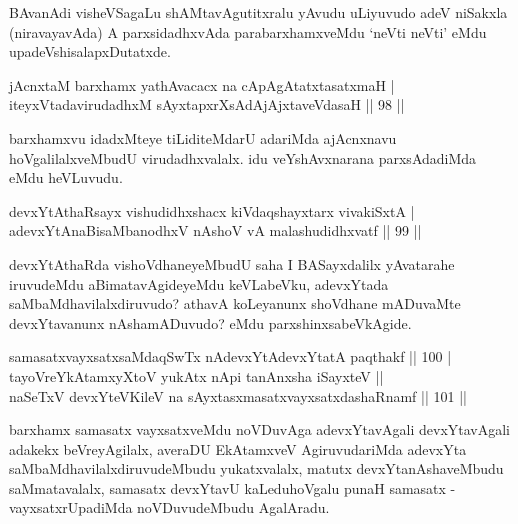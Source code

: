 \begin{artha}
BAvanAdi visheVSagaLu shAMtavAgutitxralu yAvudu uLiyuvudo adeV niSakxla (niravayavAda) A parxsidadhxvAda parabarxhamxveMdu `neVti neVti' eMdu upadeVshisalapxDutatxde.
\end{artha}

\begin{shl}
jAcnxtaM barxhamx yathAvacacx na cApAgAtatxtasatxmaH |\\
iteyxVtadavirudadhxM sAyxtapxrXsAdAjAjxtaveVdasaH \hfill || 98 ||
\end{shl}

\begin{artha}
barxhamxvu idadxMteye tiLiditeMdarU adariMda ajAcnxnavu hoVgalilalxveMbudU virudadhxvalalx. idu veYshAvxnarana parxsAdadiMda eMdu heVLuvudu.
\end{artha}


\begin{shl}
devxYtAthaRsayx vishudidhxshacx kiVdaqshayxtarx vivakiSxtA |\\
adevxYtAnaBisaMbanodhxV nAshoV vA malashudidhxvatf \hfill || 99 ||
\end{shl}

\begin{artha}
devxYtAthaRda vishoVdhaneyeMbudU saha I BASayxdalilx yAvatarahe iruvudeMdu aBimatavAgideyeMdu keVLabeVku, adevxYtada saMbaMdhavilalxdiruvudo? athavA koLeyanunx shoVdhane mADuvaMte devxYtavanunx nAshamADuvudo? eMdu parxshinxsabeVkAgide.
\end{artha}


\begin{shl}
samasatxvayxsatxsaMdaqSwTx nAdevxYtAdevxYtatA paqthakf \hfill || 100 |\\
tayoVreYkAtamxyXtoV yukAtx nApi tanAnxsha iSayxteV ||\\
naSeTxV devxYteV\s KileV na sAyxtasxmasatxvayxsatxdashaRnamf \hfill || 101 ||
\end{shl}

\begin{artha}
barxhamx samasatx vayxsatxveMdu noVDuvAga adevxYtavAgali devxYtavAgali adakekx beVreyAgilalx, averaDU EkAtamxveV AgiruvudariMda adevxYta saMbaMdhavilalxdiruvudeMbudu yukatxvalalx, matutx devxYtanAshaveMbudu saMmatavalalx, samasatx devxYtavU kaLeduhoVgalu punaH samasatx - vayxsatxrUpadiMda noVDuvudeMbudu AgalAradu.
\end{artha}

